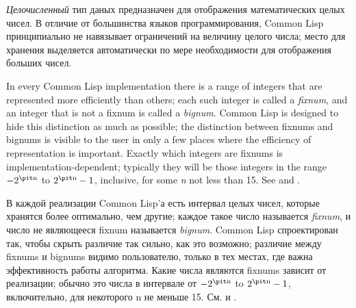 {\it Целочисленный} тип даных предназначен для отображения
математических целых чисел. В отличие от большинства языков
программирования, Common Lisp принципиально не навязывает
ограничений на величину целого числа; место для хранения
выделяется автоматически по мере необходимости для отображения
больших чисел.

In every Common Lisp implementation there is a range of integers that are
represented more efficiently than others; each such integer is called a
{\it fixnum}, and an integer that is not a fixnum is called a
{\it bignum}.
Common Lisp is designed to hide this distinction as much as possible;
the distinction between fixnums and bignums is visible to
the user in only a few places where the efficiency of representation is
important.  Exactly which integers are
fixnums is implementation-dependent; typically they will be those
integers in the range $-2^{\hbox{\scriptsize\it n}}$ to $2^{\hbox{\scriptsize\it n}}-1$,
inclusive, for some {\it n} not less than 15.
See  and .

В каждой реализации Common Lisp'а есть интервал целых чисел,
которые хранятся более оптимально, чем другие; каждое такое число
называется {\it fixnum}, и число не являющееся fixnum называется
{\it bignum}. Common Lisp спроектирован так, чтобы скрыть различие так
сильно, как это возможно; различие между fixnums и bignums видимо
пользователю, только в тех местах, где важна эффективность работы
алгоритма. Какие числа являются fixnums зависит от реализации;
обычно это числа в интервале от $-2^{\hbox{\scriptsize\it n}}$ to
$2^{\hbox{\scriptsize\it n}}-1$, включительно, для некоторого n не меньше
15. См.  и . 

